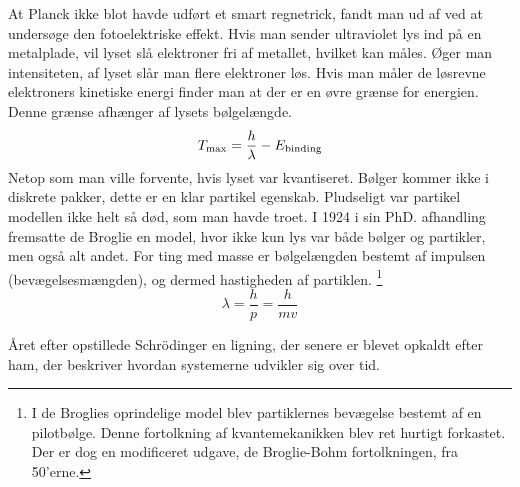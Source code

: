 \documentclass[../Kvantemekanik.tex]{subfiles}
\begin{document}
At Planck ikke blot havde udført et smart regnetrick, fandt man ud af ved at undersøge den fotoelektriske effekt. Hvis man sender ultraviolet lys ind på en metalplade, vil lyset slå elektroner fri af metallet, hvilket kan måles. Øger man intensiteten, af lyset slår man flere elektroner løs. Hvis man måler de løsrevne elektroners kinetiske energi finder man at der er en øvre grænse for energien. Denne grænse afhænger af lysets bølgelængde.
\begin{equation}
T_{\text{max}} = \frac{h}{\lambda}-E_{\text{binding}}
\end{equation}
Netop som man ville forvente, hvis lyset var kvantiseret. Bølger kommer ikke i diskrete pakker, dette er en klar partikel egenskab.
Pludseligt var partikel modellen ikke helt så død, som man havde troet. I 1924 i sin PhD. afhandling fremsatte de Broglie en model, hvor ikke kun lys var både bølger og partikler, men også alt andet. For ting med masse er bølgelængden bestemt af impulsen (bevægelsesmængden), og dermed hastigheden af partiklen.
\footnote{I de Broglies oprindelige model blev partiklernes bevægelse bestemt af en pilotbølge. Denne fortolkning af kvantemekanikken blev ret hurtigt forkastet. Der er dog en modificeret udgave, de Broglie-Bohm fortolkningen, fra 50'erne.}
\begin{equation}
\lambda = \frac{h}{p} = \frac{h}{mv}
\end{equation}

Året efter opstillede Schrödinger en ligning, der senere er blevet opkaldt efter ham, der beskriver hvordan systemerne udvikler sig over tid. 
\end{document}
